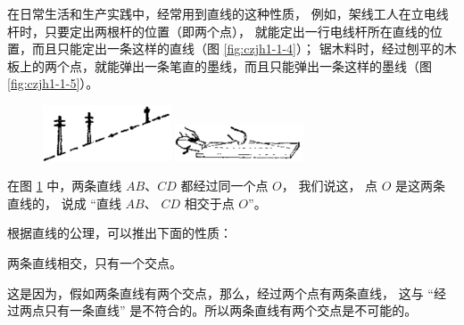 在日常生活和生产实践中，经常用到直线的这种性质，
例如，架线工人在立电线杆时，只要定出两根杆的位置（即两个点），
就能定出一行电线杆所在直线的位置，而且只能定出一条这样的直线（图 \ref{fig:czjh1-1-4}）；
锯木料时，经过刨平的木板上的两个点，就能弹出一条笔直的墨线，而且只能弹出一条这样的墨线（图 \ref{fig:czjh1-1-5}）。

\begin{figure}[htbp]
    \centering
    \begin{minipage}[b]{5cm}
        \centering
        \includegraphics[width=3.8cm]{../pic/czjh1-ch1-04.png}
        \caption{}\label{fig:czjh1-1-4}
    \end{minipage}
    \qquad
    \begin{minipage}[b]{5cm}
        \centering
        \includegraphics[width=3.8cm]{../pic/czjh1-ch1-05.png}
        \caption{}\label{fig:czjh1-1-5}
    \end{minipage}
    \qquad
    \begin{minipage}[b]{4cm}
        \centering
        
        \caption{}\label{fig:czjh1-1-6}
    \end{minipage}
\end{figure}

在图 \ref{fig:czjh1-1-6} 中，两条直线 $AB$、$CD$ 都经过同一个点 $O$， 我们说这，
点 $O$ 是这两条直线的， 说成 “直线 $AB$、 $CD$ 相交于点 $O$”。

根据直线的公理，可以推出下面的性质：

\begin{xingzhi}
    两条直线相交，只有一个交点。
\end{xingzhi}

这是因为，假如两条直线有两个交点，那么，经过两个点有两条直线，
这与 “经过两点只有一条直线” 是不符合的。所以两条直线有两个交点是不可能的。


